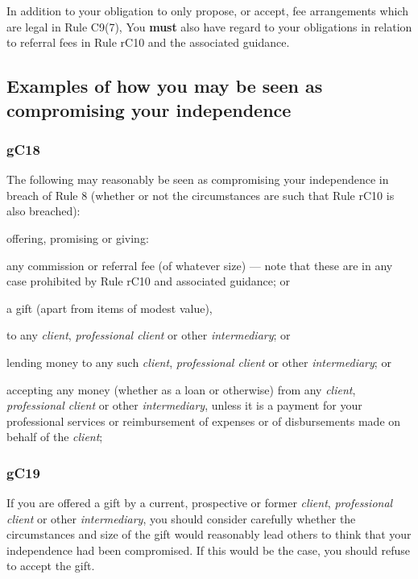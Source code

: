In addition to your obligation to only propose, or accept, fee
arrangements which are legal in Rule C9(7), You \textcolor{myred}{\textbf{must}} also have regard to
your obligations in relation to referral fees in Rule rC10 and the
associated guidance.

\subsection{Examples of how you may be seen as compromising your
independence}

\subsubsection{\color{darkgrey}gC18}

The following may reasonably be seen as compromising your independence
in breach of Rule 8 (whether or not the circumstances are such that Rule
rC10 is also breached):
\begin{numlist}\item offering, promising or giving:
\begin{alphlist}\item any commission or referral fee (of whatever size) — note that these
are in any case prohibited by Rule rC10 and associated guidance; or
\item a gift (apart from items of modest value),\end{alphlist}

to any \emph{client}, \emph{professional client} or other
\emph{intermediary}; or
\item lending money to any such \emph{client}, \emph{professional client}
or other \emph{intermediary}; or
\item accepting any money (whether as a loan or otherwise) from any
\emph{client}, \emph{professional client} or other \emph{intermediary},
unless it is a payment for your professional services or reimbursement
of expenses or of disbursements made on behalf of the \emph{client};
\end{numlist}

\subsubsection{\color{darkgrey}gC19}

If you are offered a gift by a current, prospective or former
\emph{client}, \emph{professional client} or other \emph{intermediary},
you should consider carefully whether the circumstances and size of the
gift would reasonably lead others to think that your independence had
been compromised. If this would be the case, you should refuse to accept
the gift.

